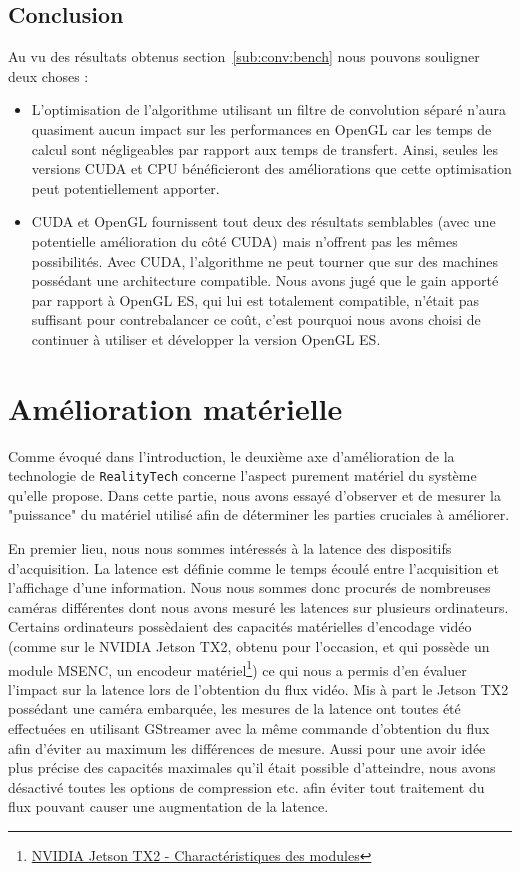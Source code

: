 \subsection{Conclusion}
Au vu des résultats obtenus section~\ref{sub:conv:bench} nous pouvons souligner deux choses :
\begin{itemize}
\item L'optimisation de l'algorithme utilisant un filtre de convolution séparé n'aura quasiment aucun impact sur les performances en OpenGL car les temps de calcul sont négligeables par rapport aux temps de transfert. Ainsi, seules les versions CUDA et CPU bénéficieront des améliorations que cette optimisation peut potentiellement apporter.
\item CUDA et OpenGL fournissent tout deux des résultats semblables (avec une potentielle amélioration du côté CUDA) mais n'offrent pas les mêmes possibilités. Avec CUDA, l'algorithme ne peut tourner que sur des machines possédant une architecture compatible. Nous avons jugé que le gain apporté par rapport à OpenGL ES, qui lui est totalement compatible, n'était pas suffisant pour contrebalancer ce coût, c'est pourquoi nous avons choisi de continuer à utiliser et développer la version OpenGL ES.
\end{itemize}

\newpage
\section{Amélioration matérielle}
\label{sec:hardwareup}
Comme évoqué dans l'introduction, le deuxième axe d'amélioration de la technologie de \texttt{RealityTech} concerne l'aspect purement matériel du système qu'elle propose. Dans cette partie, nous avons essayé d'observer et de mesurer la "puissance" du matériel utilisé afin de déterminer les parties cruciales à améliorer.

En premier lieu, nous nous sommes intéressés à la latence des dispositifs d'acquisition. La latence est définie comme le temps écoulé entre l'acquisition et l'affichage d'une information. 
Nous nous sommes donc procurés de nombreuses caméras différentes dont nous avons mesuré les latences sur plusieurs ordinateurs. Certains ordinateurs possèdaient des capacités matérielles d'encodage vidéo (comme sur le NVIDIA Jetson TX2, obtenu pour l'occasion, et qui possède un module MSENC, un encodeur matériel\footnote{\href{https://www.nvidia.fr/autonomous-machines/embedded-systems-dev-kits-modules/}{NVIDIA Jetson TX2 - Charactéristiques des modules}}) ce qui nous a permis d'en évaluer l'impact sur la latence lors de l'obtention du flux vidéo. Mis à part le Jetson TX2 possédant une caméra embarquée, les mesures de la latence ont toutes été effectuées en utilisant GStreamer\cite{gstreamer} avec la même commande d'obtention du flux afin d'éviter au maximum les différences de mesure. Aussi pour une avoir idée plus précise des capacités maximales qu'il était possible d'atteindre, nous avons désactivé toutes les options de compression etc. afin éviter tout traitement du flux pouvant causer une augmentation de la latence.

